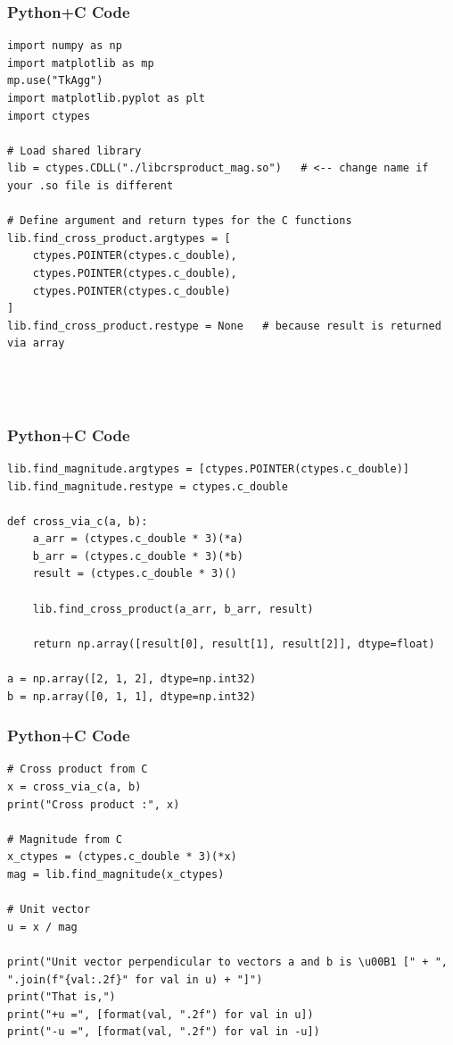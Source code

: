 \documentclass{beamer}
\begin{document}
\begin{frame}[fragile]
    \frametitle{Python+C Code}
    \begin{lstlisting}
import numpy as np
import matplotlib as mp
mp.use("TkAgg")
import matplotlib.pyplot as plt
import ctypes

# Load shared library
lib = ctypes.CDLL("./libcrsproduct_mag.so")   # <-- change name if your .so file is different

# Define argument and return types for the C functions
lib.find_cross_product.argtypes = [
    ctypes.POINTER(ctypes.c_double), 
    ctypes.POINTER(ctypes.c_double), 
    ctypes.POINTER(ctypes.c_double)
]
lib.find_cross_product.restype = None   # because result is returned via array




    \end{lstlisting}
\end{frame}

\begin{frame}[fragile]
    \frametitle{Python+C Code}
    \begin{lstlisting}
lib.find_magnitude.argtypes = [ctypes.POINTER(ctypes.c_double)]
lib.find_magnitude.restype = ctypes.c_double

def cross_via_c(a, b):
    a_arr = (ctypes.c_double * 3)(*a)
    b_arr = (ctypes.c_double * 3)(*b)
    result = (ctypes.c_double * 3)()

    lib.find_cross_product(a_arr, b_arr, result)

    return np.array([result[0], result[1], result[2]], dtype=float)

a = np.array([2, 1, 2], dtype=np.int32)
b = np.array([0, 1, 1], dtype=np.int32)

    \end{lstlisting}
\end{frame}

\begin{frame}[fragile]
    \frametitle{Python+C Code}
    \begin{lstlisting}
# Cross product from C
x = cross_via_c(a, b)
print("Cross product :", x)

# Magnitude from C
x_ctypes = (ctypes.c_double * 3)(*x)
mag = lib.find_magnitude(x_ctypes)

# Unit vector
u = x / mag

print("Unit vector perpendicular to vectors a and b is \u00B1 [" + ", ".join(f"{val:.2f}" for val in u) + "]")
print("That is,")
print("+u =", [format(val, ".2f") for val in u])
print("-u =", [format(val, ".2f") for val in -u])

    \end{lstlisting}
\end{frame}
\end{document}
